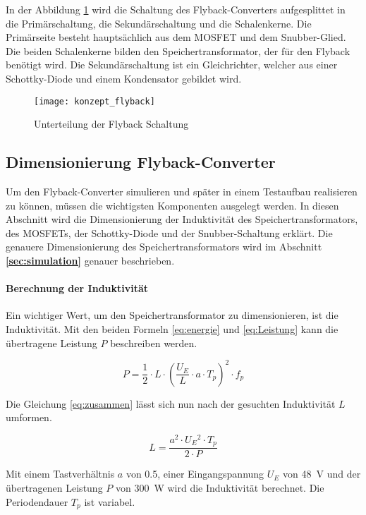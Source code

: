 In der Abbildung \ref{fig:konzept_flyback} wird die Schaltung des Flyback-Converters aufgesplittet in die Primärschaltung, die Sekundärschaltung und die Schalenkerne. Die Primärseite besteht hauptsächlich aus dem MOSFET und dem Snubber-Glied. Die beiden Schalenkerne bilden den Speichertransformator, der für den Flyback benötigt wird. Die Sekundärschaltung ist ein Gleichrichter, welcher aus einer Schottky-Diode und einem Kondensator gebildet wird.
\begin{figure}[h]
	\centering
	\texttt{[image: konzept\_flyback]}
	\caption{Unterteilung der Flyback Schaltung}\label{fig:konzept_flyback}
\end{figure}


\subsection{Dimensionierung Flyback-Converter}

Um den Flyback-Converter simulieren und später in einem Testaufbau realisieren zu können, müssen die wichtigsten Komponenten ausgelegt werden. In diesen Abschnitt wird die Dimensionierung der Induktivität des Speichertransformators, des MOSFETs, der Schottky-Diode und der Snubber-Schaltung erklärt. Die genauere Dimensionierung des Speichertransformators wird im Abschnitt  \textbf{\ref{sec:simulation} } genauer beschrieben.

\paragraph{Berechnung der Induktivität}
Ein wichtiger Wert, um den Speichertransformator zu dimensionieren, ist die Induktivität. Mit den beiden Formeln \ref{eq:energie} und \ref{eq:Leistung} kann die übertragene Leistung $ P $ beschreiben werden. \cite{lea}

\begin{equation}\label{eq:zusammen}
P = \frac{1}{2} \cdot L \cdot \left (\frac{U_{E}}{L}\cdot a \cdot T_{p}\right ) ^{2} \cdot f_{p}
\end{equation}

Die Gleichung \ref{eq:zusammen} lässt sich nun nach der gesuchten Induktivität $ L $ umformen.

\begin{equation}\label{eq:induktivität}
L = \frac{a^{2}\cdot U_{E}\!^{2}\cdot T_{p}}{2 \cdot P}
\end{equation}

Mit einem Tastverhältnis $ a $ von 0.5, einer Eingangspannung $ U_{E} $ von \SI{48}{V} und der übertragenen Leistung $ P $ von \SI{300}{W} wird die Induktivität berechnet. Die Periodendauer $ T_{p} $ ist variabel.

